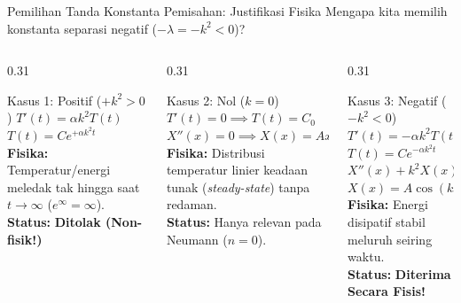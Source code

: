 \documentclass[aspectratio=169,10pt]{beamer}
\begin{document}
\begin{frame}{Pemilihan Tanda Konstanta Pemisahan: Justifikasi Fisika}
  Mengapa kita memilih konstanta separasi negatif ($-\lambda = -k^2 < 0$)?
  \vspace{0.1cm}
  \begin{columns}[t]
    \begin{column}{0.31\textwidth}
      \begin{exampleblock}{Kasus 1: Positif ($+k^2 > 0$)}
        \small
        $T'(t) = \alpha k^2 T(t)$\\
        $T(t) = C e^{+\alpha k^2 t}$\\
        \textbf{Fisika:} Temperatur/energi meledak tak hingga saat $t \to \infty$ ($e^{\infty} = \infty$).\\
        \textbf{Status:} \color{red}\textbf{Ditolak (Non-fisik!)}
      \end{exampleblock}
    \end{column}
    \begin{column}{0.31\textwidth}
      \begin{block}{Kasus 2: Nol ($k = 0$)}
        \small
        $T'(t) = 0 \implies T(t) = C_0$\\
        $X''(x) = 0 \implies X(x) = Ax + B$\\
        \textbf{Fisika:} Distribusi temperatur linier keadaan tunak (\textit{steady-state}) tanpa redaman.\\
        \textbf{Status:} Hanya relevan pada Neumann ($n=0$).
      \end{block}
    \end{column}
    \begin{column}{0.31\textwidth}
      \begin{alertblock}{Kasus 3: Negatif ($-k^2 < 0$)}
        \small
        $T'(t) = -\alpha k^2 T(t)$\\
        $T(t) = C e^{-\alpha k^2 t}$\\
        $X''(x) + k^2 X(x) = 0$\\
        $X(x) = A\cos(kx) + B\sin(kx)$\\
        \textbf{Fisika:} Energi disipatif stabil meluruh seiring waktu.\\
        \textbf{Status:} \color{unibgreen}\textbf{Diterima Secara Fisis!}
      \end{alertblock}
    \end{column}
  \end{columns}
\end{frame}
\end{document}
